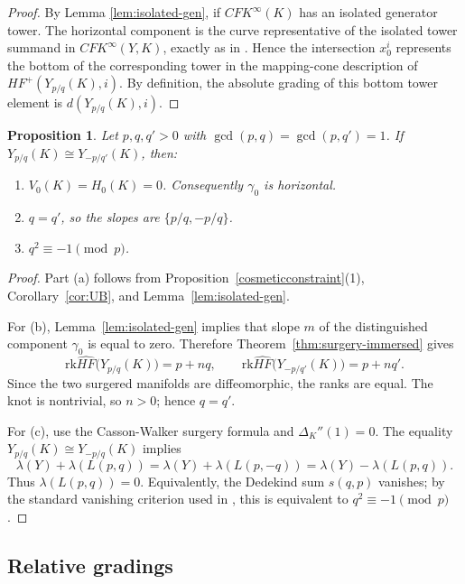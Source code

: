 \documentclass[12pt]{amsart}
\newtheorem{proposition}[theorem]{Proposition}
\theoremstyle{definition}
\theoremstyle{definition}
\newcommand{\CFKINFTY}{{CFK}^{\infty}}
\newcommand{\HFhat}{\widehat{HF}}
\newcommand{\rk}{\text{rk}}
\newcommand{\din}{d}
\begin{document}
\begin{proof}
By Lemma \ref{lem:isolated-gen}, if $\CFKINFTY(K)$ has an isolated generator tower. 
The horizontal component is the curve representative of the isolated tower
summand in $\CFKINFTY(Y,K)$, exactly as in \cite[Proposition~17]{Han}.  Hence the intersection $x_0^i$ represents the
bottom of the corresponding tower in the mapping-cone description of
$HF^+(Y_{p/q}(K),i)$.  By definition, the absolute grading of this bottom tower
element is $\din(Y_{p/q}(K),i)$.
\end{proof}

\begin{proposition}\label{prop:adapted-NiWu}
Let $p,q,q'>0$ with $\gcd(p,q)=\gcd(p,q')=1$.  If
$Y_{p/q}(K)\cong Y_{-p/q'}(K)$, then:
\begin{enumerate}
\item[\rm (a)] $V_0(K)=H_0(K)=0$.  Consequently $\gamma_0$ is horizontal.
\item[\rm (b)] $q=q'$, so the slopes are $\{p/q,-p/q\}$.
\item[\rm (c)] $q^2\equiv -1\pmod p$.
\end{enumerate}
\end{proposition}
\begin{proof}
Part \textup{(a)} follows from Proposition~\ref{cosmeticconstraint}(1),
Corollary~\ref{cor:UB}, and Lemma~\ref{lem:isolated-gen}.

For \textup{(b)}, Lemma~\ref{lem:isolated-gen} implies that slope $m$ of the distinguished component $\gamma_0$ is equal to zero.  Therefore
Theorem~\ref{thm:surgery-immersed} gives
\[
\rk\HFhat\bigl(Y_{p/q}(K)\bigr)=p+nq,
\qquad
\rk\HFhat\bigl(Y_{-p/q'}(K)\bigr)=p+nq'.
\]
Since the two surgered manifolds are diffeomorphic, the ranks are equal.  The
knot is nontrivial, so $n>0$; hence $q=q'$.

For \textup{(c)}, use the Casson-Walker surgery formula and
$\Delta_K''(1)=0$.  The equality
$Y_{p/q}(K)\cong Y_{-p/q}(K)$ implies
\[
\lambda(Y)+\lambda(L(p,q))
 = \lambda(Y)+\lambda(L(p,-q))
 = \lambda(Y)-\lambda(L(p,q)).
\]
Thus $\lambda(L(p,q))=0$.  Equivalently, the Dedekind sum $s(q,p)$ vanishes;
by the standard vanishing criterion used in \cite[Lemma~23]{Han}, this is
equivalent to $q^2\equiv -1\pmod p$.
\end{proof}

\subsection{Relative gradings}
\end{document}
